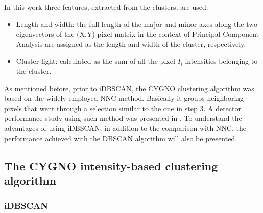 \documentclass[a4paper,11pt]{article}
\begin{document}
In this work three features, extracted from the clusters, are used: 
\begin{itemize}
    
    \item Length and width:
    the full length of the major and minor axes along the two eigenvectors of the (X,Y) pixel matrix in the context of Principal Component Analysis \cite{jolliffe2002springer} are assigned as the length and width of the cluster, respectively.
    
    \item Cluster light: calculated as the sum of all the pixel $I_i$ intensities belonging to the cluster.
\end{itemize}


As mentioned before, prior to iDBSCAN, the CYGNO clustering algorithm was based on the widely employed NNC method. Basically it groups neighboring pixels that went through a selection similar to the one in step 3. A detector performance study using such method was presented in \cite{bib:fe55}.
To understand the advantages of using iDBSCAN, in addition to the comparison with NNC, the performance achieved with the DBSCAN algorithm will also be presented.

\subsection{The CYGNO intensity-based clustering algorithm}
\label{sec:dbscan}


\subsubsection{iDBSCAN}
\end{document}
